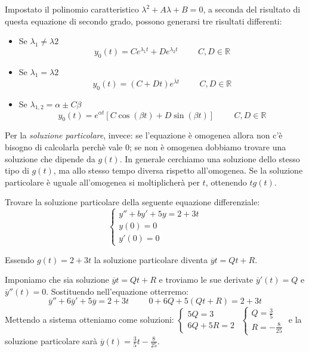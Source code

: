 Impostato il polinomio caratteristico $\lambda^2+A\lambda+B=0$, a seconda del risultato di questa equazione di secondo grado, possono generarsi tre risultati differenti:
\begin{itemize}
    \item Se $\lambda_1\neq\lambda2$\begin{equation*}y_0(t)=Ce^{\lambda_1t}+De^{\lambda_2t}\hspace{1cm}C, D\in\mathbb{R}\end{equation*}
    \item Se $\lambda_1=\lambda2$\begin{equation*}y_0(t)=(C+Dt)e^{\overline{\lambda}t}\hspace{1cm}C, D\in\mathbb{R}\end{equation*}
    \item Se $\lambda_{1,2}=\alpha\pm C\beta$\begin{equation*}y_0(t)=e^{\alpha t}[C\cos(\beta t)+D\sin(\beta t)]\hspace{1cm}C, D\in\mathbb{R}\end{equation*}
\end{itemize}

Per la \textit{soluzione particolare}, invece: se l'equazione è omogenea allora non c'è bisogno di calcolarla perchè vale 0; se non è omogenea dobbiamo trovare una soluzione che dipende da $g(t)$. In generale cerchiamo una soluzione dello stesso tipo di $g(t)$, ma allo stesso tempo diversa rispetto all'omogenea. Se la soluzione particolare è uguale all'omogenea si moltiplicherà per $t$, ottenendo $tg(t)$.

\begin{example} Trovare la soluzione particolare della seguente equazione differenziale:
\begin{equation*}\begin{cases}y''+by'+5y=2+3t\\y(0)=0\\y'(0)=0\end{cases}\end{equation*}

    Essendo $g(t)=2+3t$ la soluzione particolare diventa $\overline{y}t=Qt+R$.
    
    Imponiamo che sia soluzione $\overline{y}t=Qt+R$ e troviamo le sue derivate $\overline{y}'(t)=Q$ e $\overline{y}''(t)=0$. Sostituendo nell'equazione otterremo:
    \begin{equation*}
        \overline{y}''+6\overline{y}'+5\overline{y}=2+3t\hspace{1cm}0+6Q+5(Qt+R)=2+3t
    \end{equation*}
    Mettendo a sistema otteniamo come soluzioni:
    $\begin{cases}5Q=3\\6Q+5R=2\end{cases}$ $\begin{cases}Q=\frac{3}{5}\\R=-\frac{8}{25}\end{cases}$
    e la soluzione particolare sarà $\overline{y}(t)=\frac{3}{5}t-\frac{8}{25}$.
\end{example}

